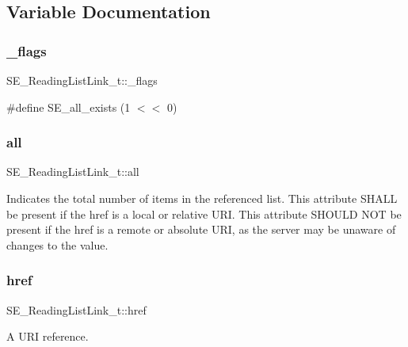 \subsection{Variable Documentation}
\mbox{\label{group__ReadingListLink_ga3bcdb8ba57667805de6274f90241d39d}} 
\subsubsection{\texorpdfstring{\+\_\+flags}{\_flags}}
{\footnotesize\ttfamily S\+E\+\_\+\+Reading\+List\+Link\+\_\+t\+::\+\_\+flags}

\#define S\+E\+\_\+all\+\_\+exists (1 $<$$<$ 0) \mbox{\label{group__ReadingListLink_ga7ae6dcda4fc482302e9eef04cc34b2de}} 
\subsubsection{\texorpdfstring{all}{all}}
{\footnotesize\ttfamily S\+E\+\_\+\+Reading\+List\+Link\+\_\+t\+::all}

Indicates the total number of items in the referenced list. This attribute S\+H\+A\+LL be present if the href is a local or relative U\+RI. This attribute S\+H\+O\+U\+LD N\+OT be present if the href is a remote or absolute U\+RI, as the server may be unaware of changes to the value. \mbox{\label{group__ReadingListLink_gaa80ddfa1789e318808c6e6ec18dea4b3}} 
\subsubsection{\texorpdfstring{href}{href}}
{\footnotesize\ttfamily S\+E\+\_\+\+Reading\+List\+Link\+\_\+t\+::href}

A U\+RI reference. 